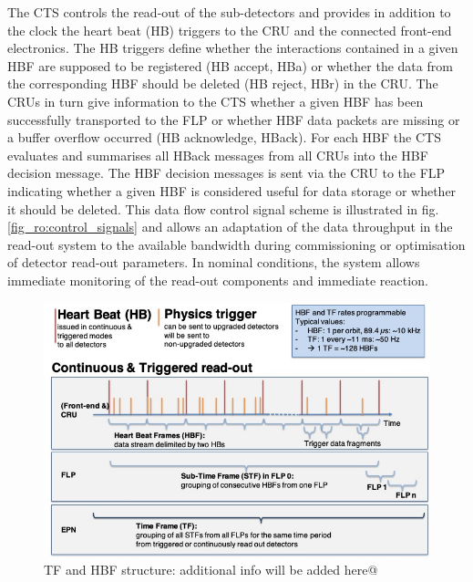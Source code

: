 The CTS controls the read-out of the sub-detectors and provides in addition to the clock the heart beat (HB) triggers to the CRU and the connected front-end electronics. The HB triggers define whether the interactions contained in a given HBF are supposed to be registered (HB accept, HBa) or whether the data from the corresponding HBF should be deleted (HB reject, HBr) in the CRU. The CRUs in turn give information to the CTS whether a given HBF has been successfully transported to the FLP or whether HBF data packets are missing or a buffer overflow occurred (HB acknowledge, HBack). 
For each HBF the CTS evaluates and summarises all HBack messages from all CRUs into the  HBF decision message. The HBF decision messages is sent via the CRU to the FLP indicating whether a given HBF is considered useful for data storage or whether it should be deleted. This data flow control signal scheme is illustrated in fig. \ref{fig_ro:control_signals} and allows an adaptation of the data throughput in the read-out system to the available bandwidth during commissioning or optimisation of detector read-out parameters. In nominal conditions, the system allows immediate monitoring of the read-out components and immediate reaction.

\begin{figure}[hbtp]
  \begin{center}
    \includegraphics[width=1.\textwidth]{../fig/cru/tf_hbf_structure.jpg}
  \end{center}
  \caption{TF and HBF structure: additional info will be added here@}
  \label{fig_ro:tf_hbf_structure}
\end{figure}

